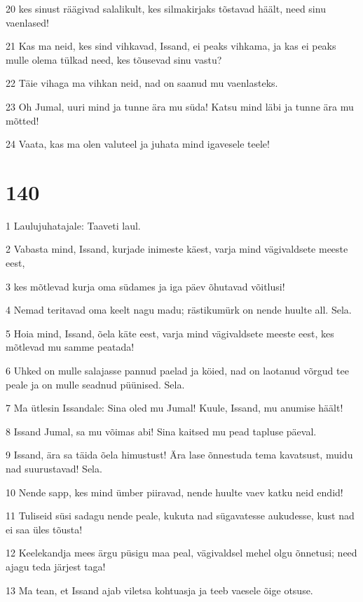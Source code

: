 \par 20 kes sinust räägivad salalikult, kes silmakirjaks tõstavad häält, need sinu vaenlased!
\par 21 Kas ma neid, kes sind vihkavad, Issand, ei peaks vihkama, ja kas ei peaks mulle olema tülkad need, kes tõusevad sinu vastu?
\par 22 Täie vihaga ma vihkan neid, nad on saanud mu vaenlasteks.
\par 23 Oh Jumal, uuri mind ja tunne ära mu süda! Katsu mind läbi ja tunne ära mu mõtted!
\par 24 Vaata, kas ma olen valuteel ja juhata mind igavesele teele!

\chapter{140}

\par 1 Laulujuhatajale: Taaveti laul.
\par 2 Vabasta mind, Issand, kurjade inimeste käest, varja mind vägivaldsete meeste eest,
\par 3 kes mõtlevad kurja oma südames ja iga päev õhutavad võitlusi!
\par 4 Nemad teritavad oma keelt nagu madu; rästikumürk on nende huulte all. Sela.
\par 5 Hoia mind, Issand, õela käte eest, varja mind vägivaldsete meeste eest, kes mõtlevad mu samme peatada!
\par 6 Uhked on mulle salajasse pannud paelad ja köied, nad on laotanud võrgud tee peale ja on mulle seadnud püünised. Sela.
\par 7 Ma ütlesin Issandale: Sina oled mu Jumal! Kuule, Issand, mu anumise häält!
\par 8 Issand Jumal, sa mu võimas abi! Sina kaitsed mu pead tapluse päeval.
\par 9 Issand, ära sa täida õela himustust! Ära lase õnnestuda tema kavatsust, muidu nad suurustavad! Sela.
\par 10 Nende sapp, kes mind ümber piiravad, nende huulte vaev katku neid endid!
\par 11 Tuliseid süsi sadagu nende peale, kukuta nad sügavatesse aukudesse, kust nad ei saa üles tõusta!
\par 12 Keelekandja mees ärgu püsigu maa peal, vägivaldsel mehel olgu õnnetusi; need ajagu teda järjest taga!
\par 13 Ma tean, et Issand ajab viletsa kohtuasja ja teeb vaesele õige otsuse.

